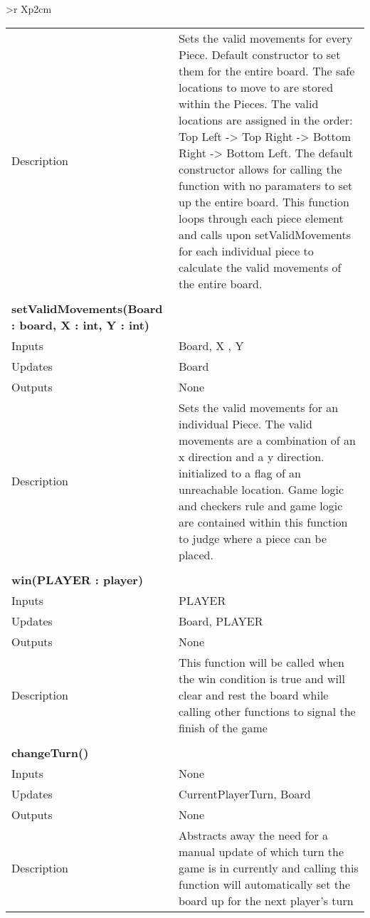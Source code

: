 \documentclass[10pt]{article}
\begin{document}
\begin{longtabu}{ >{\bfseries}r Xp{2cm} }
\begin{tabular}[t]{@{} p{4cm} p{8cm}}
                                    Description & Sets the valid movements for every Piece. Default constructor to set them for the entire board. The safe locations to move to are stored within the Pieces. The valid locations are assigned in the order: Top Left -> Top Right -> Bottom Right -> Bottom Left. The default constructor allows for calling the function with no paramaters to set up the entire board. This function loops through each piece element and calls upon setValidMovements for each individual piece to calculate the valid movements of the entire board. \\
                                    & \\
                                    \bf{setValidMovements(Board : board, X : int, Y : int)} & \\
                                    Inputs & Board, X , Y \\
                                    Updates & Board \\
                                    Outputs & None \\
                                    Description & Sets the valid movements for an individual Piece. The valid movements are a combination of an x direction and a y direction. initialized to a flag of an unreachable location. Game logic and checkers rule and game logic are contained within this function to judge where a piece can be placed. \\
                                    & \\
                                    \bf{win(PLAYER : player)} & \\
          		                    Inputs & PLAYER \\
                                    Updates & Board, PLAYER \\
                                    Outputs & None \\
                                    Description & This function will be called when the win condition is true and will clear and rest the board while calling other functions to signal the finish of the game \\
                                    & \\
                                    \bf{changeTurn()} & \\
          		                    Inputs & None \\
                                    Updates & CurrentPlayerTurn, Board \\
                                    Outputs & None \\
                                    Description & Abstracts away the need for a manual update of which turn the game is in currently and calling this function will automatically set the board up for the next player's turn \\
                              \end{tabular} \\
        \end{longtabu}
\end{document}
